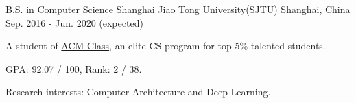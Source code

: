 


\begin{cventries}

\cventry
{B.S. in Computer Science}
{\href{http://en.sjtu.edu.cn/}{Shanghai Jiao Tong University(SJTU)}}
{Shanghai, China}
{Sep. 2016 - Jun. 2020 (expected)}
{
	\begin{cvitems}
		\item {A student of \href{https://acm.sjtu.edu.cn}{ACM Class}, an elite CS program for top 5\% talented students.}
        \item {GPA: 92.07 / 100, Rank: 2 / 38.}
        \item {Research interests: Computer Architecture and Deep Learning.}
	\end{cvitems}
}

\end{cventries}